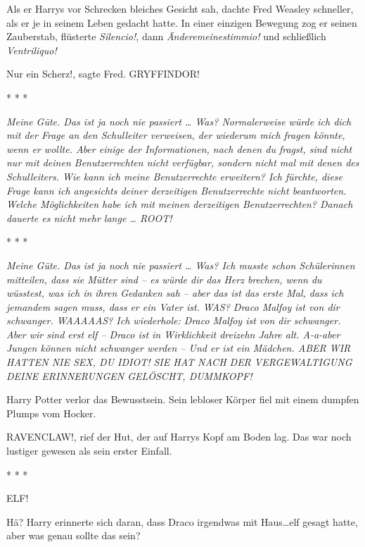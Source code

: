 Als er Harrys vor Schrecken bleiches Gesicht sah, dachte Fred Weasley schneller,
als er je in seinem Leben gedacht hatte. In einer einzigen Bewegung zog er
seinen Zauberstab, flüsterte \emph{\glqq{}Silencio!\grqq{}}, dann \emph{\glqq
Änderemeinestimmio!\grqq{}} und schließlich \emph{\glqq{}Ventriliquo!\grqq{}}

\glqq{}Nur ein Scherz!\grqq{}, sagte Fred. \glqq{}GRYFFINDOR!\grqq{}

* * *

\emph{\glqq{}Meine Güte. Das ist ja noch nie passiert …\grqq{}
Was? \glqq{}Normalerweise würde ich dich mit der Frage an den Schulleiter
verweisen, der wiederum mich fragen könnte, wenn er wollte. Aber einige der
Informationen, nach denen du fragst, sind nicht nur mit deinen Benutzerrechten
nicht verfügbar, sondern nicht mal mit denen des Schulleiters.\grqq{} Wie kann
ich meine Benutzerrechte erweitern? \glqq{}Ich fürchte, diese Frage kann ich
angesichts deiner derzeitigen Benutzerrechte nicht beantworten.\grqq{} Welche
Möglichkeiten habe \emph{ich mit meinen derzeitigen Benutzerrechten?} Danach
dauerte es nicht mehr lange … \glqq{}ROOT!\grqq{}}

* * *

\emph{\glqq{}Meine Güte. Das ist ja noch nie passiert …\grqq{}
Was? \glqq{}Ich musste schon Schülerinnen mitteilen, dass sie Mütter sind – es
würde dir das Herz brechen, wenn du wüsstest, was ich in ihren Gedanken sah –
aber das ist das erste Mal, dass ich jemandem sagen muss, dass er ein Vater
ist.\grqq{} WAS? \glqq{}Draco Malfoy ist von dir schwanger.\grqq{} WAAAAAS? \glqq
Ich wiederhole: Draco Malfoy ist von dir schwanger.\grqq{} Aber wir sind erst
elf – \glqq{}Draco ist in Wirklichkeit dreizehn Jahre alt.\grqq{} A-a-aber Jungen
können nicht schwanger werden – \glqq{}Und er ist ein Mädchen.\grqq{} ABER WIR
HATTEN NIE SEX, DU IDIOT! \glqq{}SIE HAT NACH DER VERGEWALTIGUNG DEINE
ERINNERUNGEN GELÖSCHT, DUMMKOPF!\grqq{}}

Harry Potter verlor das Bewusstsein. Sein lebloser Körper fiel mit einem dumpfen
Plumps vom Hocker.

\glqq{}RAVENCLAW!\grqq{}, rief der Hut, der auf Harrys Kopf am Boden lag. Das war
noch lustiger gewesen als sein erster Einfall.

* * *

\glqq{}ELF!\grqq{}

Hä? Harry erinnerte sich daran, dass Draco irgendwas mit \glqq{}Haus…elf\grqq{}
gesagt hatte, aber was genau sollte das sein?

